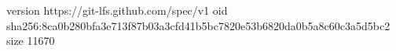 version https://git-lfs.github.com/spec/v1
oid sha256:8ca0b280bfa3e713f87b03a3cfd41b5bc7820e53b6820da0b5a8c60c3a5d5bc2
size 11670
